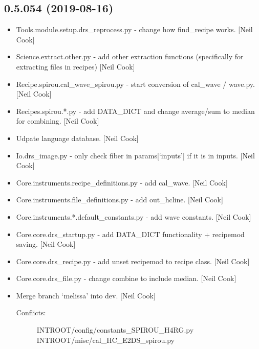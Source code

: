 \documentclass[a4paper,10pt,english]{report}
\begin{document}
\subsection{0.5.054 (2019-08-16)}
\label{\detokenize{misc/changelog:id87}}\begin{itemize}
\item {} 
Tools.module.setup.drs\_reprocess.py - change how find\_recipe works.
{[}Neil Cook{]}

\item {} 
Science.extract.other.py - add other extraction functions
(specifically for extracting files in recipes) {[}Neil Cook{]}

\item {} 
Recipe.spirou.cal\_wave\_spirou.py - start conversion of cal\_wave /
wave.py. {[}Neil Cook{]}

\item {} 
Recipes.spirou.*.py - add DATA\_DICT and change average/sum to median
for combining. {[}Neil Cook{]}

\item {} 
Udpate language database. {[}Neil Cook{]}

\item {} 
Io.drs\_image.py - only check fiber in params{[}‘inputs’{]} if it is in
inputs. {[}Neil Cook{]}

\item {} 
Core.instruments.recipe\_definitions.py - add cal\_wave. {[}Neil Cook{]}

\item {} 
Core.instruments.file\_definitions.py - add out\_hcline. {[}Neil Cook{]}

\item {} 
Core.instruments.*.default\_constants.py - add wave constants. {[}Neil
Cook{]}

\item {} 
Core.core.drs\_startup.py - add DATA\_DICT functionality + recipemod
saving. {[}Neil Cook{]}

\item {} 
Core.core.drs\_recipe.py - add unset recipemod to recipe class. {[}Neil
Cook{]}

\item {} 
Core.core.drs\_file.py - change combine to include median. {[}Neil Cook{]}

\item {} 
Merge branch ‘melissa’ into dev. {[}Neil Cook{]}
\begin{description}
\item[{Conflicts:}] \leavevmode
INTROOT/config/constants\_SPIROU\_H4RG.py
INTROOT/misc/cal\_HC\_E2DS\_spirou.py


\end{description}
\end{itemize}
\end{document}
